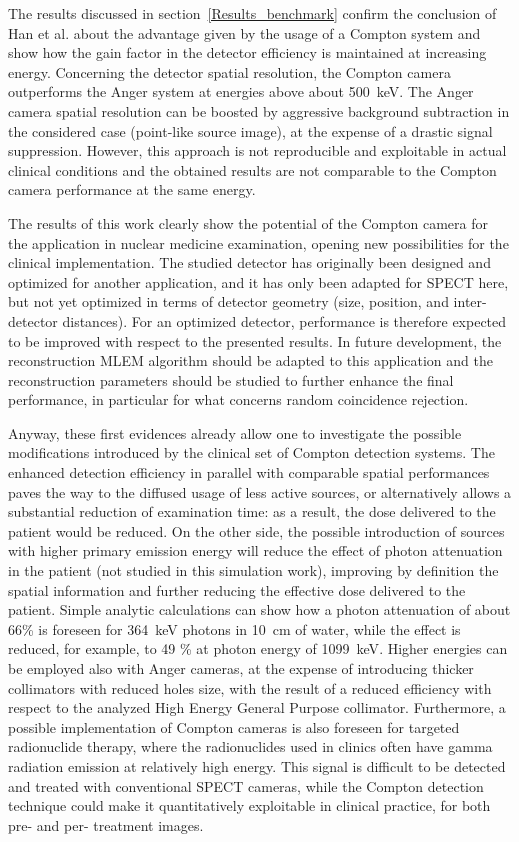 The results discussed in section~\ref{Results_benchmark} confirm the conclusion of Han et al. about the advantage given by the usage of a Compton system and show how the gain factor in the detector efficiency is maintained at increasing energy. Concerning the detector spatial resolution, the Compton camera outperforms the Anger system at energies above about 500~keV. The Anger camera spatial resolution can be boosted by aggressive background subtraction in the considered case (point-like source image), at the expense of a drastic signal suppression. However, this approach is not reproducible and exploitable in actual clinical conditions and the obtained results are not comparable to the Compton camera performance at the same energy.

The results of this work clearly show the potential of the Compton camera for the application in nuclear medicine examination, opening new possibilities for the clinical implementation. The studied detector has originally been designed and optimized for another application, and it has only been adapted for SPECT here, but not yet optimized in terms of detector geometry (size, position, and inter-detector distances). For an optimized detector, performance is therefore expected to be improved with respect to the presented results. In future development, the reconstruction MLEM algorithm should be adapted to this application and the reconstruction parameters should be studied to further enhance the final performance, in particular for what concerns random coincidence rejection.

Anyway, these first evidences already allow one to investigate the possible modifications introduced by the clinical set of Compton detection systems. The enhanced detection efficiency in parallel with comparable spatial performances paves the way to the diffused usage of less active sources, or alternatively allows a substantial reduction of examination time: as a result, the dose delivered to the patient would be reduced. On the other side, the possible introduction of sources with higher primary emission energy will reduce the effect of photon attenuation in the patient (not studied in this simulation work), improving by definition the spatial information and further reducing the effective dose delivered to the patient. Simple analytic calculations can show how a photon attenuation of about 66\% is foreseen for 364~keV photons in 10~cm of water, while the effect is reduced, for example, to 49 \% at photon energy of 1099~keV\cite{tabNIST}. Higher energies can be employed also with Anger cameras, at the expense of introducing thicker collimators with reduced holes size, with the result of a reduced efficiency with respect to the analyzed High Energy General Purpose collimator.
Furthermore, a possible implementation of Compton cameras is also foreseen for targeted radionuclide therapy, where the radionuclides used in clinics often have gamma radiation emission at relatively high energy. This signal is difficult to be detected and treated with conventional SPECT cameras, while the Compton detection technique could make it quantitatively exploitable in clinical practice, for both pre- and per- treatment images.
   
